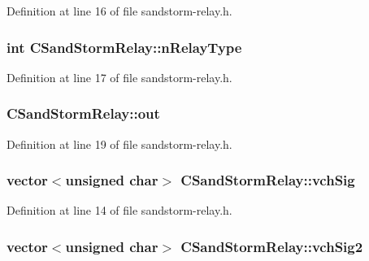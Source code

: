 Definition at line 16 of file sandstorm-\/relay.\+h.

\hypertarget{class_c_sand_storm_relay_a97f1e8d95b7a6770ce54c9c5835e535f}{}
\subsubsection[{n\+Relay\+Type}]{\setlength{\rightskip}{0pt plus 5cm}int C\+Sand\+Storm\+Relay\+::n\+Relay\+Type}\label{class_c_sand_storm_relay_a97f1e8d95b7a6770ce54c9c5835e535f}


Definition at line 17 of file sandstorm-\/relay.\+h.

\hypertarget{class_c_sand_storm_relay_a3f7d41fd5d3c55dab9e081fe10988f35}{}
\subsubsection[{out}]{ C\+Sand\+Storm\+Relay\+::out}\label{class_c_sand_storm_relay_a3f7d41fd5d3c55dab9e081fe10988f35}


Definition at line 19 of file sandstorm-\/relay.\+h.

\hypertarget{class_c_sand_storm_relay_a1e00147c64eddf291075d9a895894a98}{}
\subsubsection[{vch\+Sig}]{\setlength{\rightskip}{0pt plus 5cm}vector$<$unsigned char$>$ C\+Sand\+Storm\+Relay\+::vch\+Sig}\label{class_c_sand_storm_relay_a1e00147c64eddf291075d9a895894a98}


Definition at line 14 of file sandstorm-\/relay.\+h.

\hypertarget{class_c_sand_storm_relay_a5a9a84a315c1e649746bcbe1e5b85cb7}{}
\subsubsection[{vch\+Sig2}]{\setlength{\rightskip}{0pt plus 5cm}vector$<$unsigned char$>$ C\+Sand\+Storm\+Relay\+::vch\+Sig2}\label{class_c_sand_storm_relay_a5a9a84a315c1e649746bcbe1e5b85cb7}


